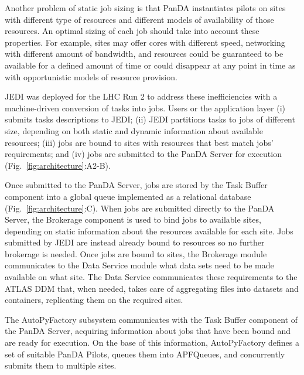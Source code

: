 Another problem of static job sizing is that PanDA instantiates pilots on sites
with different type of resources and different models of availability of those
resources. An optimal sizing of each job should take into account these
properties. For example, sites may offer cores with different speed, networking
with different amount of bandwidth, and resources could be guaranteed to be
available for a defined amount of time or could disappear at any point in time
as with opportunistic models of resource provision.

JEDI was deployed for the LHC Run 2 to address these inefficiencies with a
machine-driven conversion of tasks into jobs. Users or the application layer (i)
submits tasks descriptions to JEDI; (ii) JEDI partitions tasks to jobs of
different size, depending on both static and dynamic information about available
resources; (iii) jobs are bound to sites with resources that best match jobs'
requirements; and (iv) jobs are submitted to the PanDA Server for execution
(Fig.~\ref{fig:architecture}:A2-B).

Once submitted to the PanDA Server, jobs are stored by the Task Buffer component
into a global queue implemented as a relational database
(Fig.~\ref{fig:architecture}:C). When jobs are submitted directly to the PanDA
Server, the Brokerage component is used to bind jobs to available sites,
depending on static information about the resources available for each site.
Jobs submitted by JEDI are instead already bound to resources so no further
brokerage is needed. Once jobs are bound to sites, the Brokerage module
communicates to the Data Service module what data sets need to be made available
on what site. The Data Service communicates these requirements to the ATLAS DDM
that, when needed, takes care of aggregating files into datasets and containers,
replicating them on the required sites.

The AutoPyFactory subsystem communicates with the Task Buffer component of the
PanDA Server, acquiring information about jobs that have been bound and are
ready for execution. On the base of this information, AutoPyFactory defines a
set of suitable PanDA Pilots, queues them into APFQueues, and concurrently
submits them to multiple sites.


